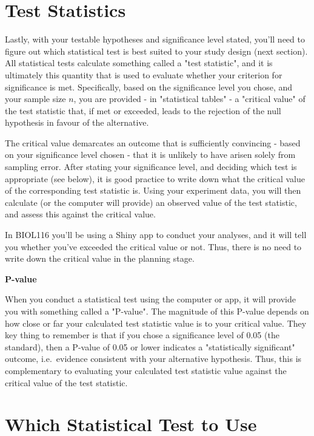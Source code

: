 \documentclass[
]{book}
\begin{document}
\hypertarget{test-statistics}{%
\section*{Test Statistics}\label{test-statistics}}

Lastly, with your testable hypotheses and significance level stated, you'll need to figure out which statistical test is best suited to your study design (next section). All statistical tests calculate something called a "test statistic", and it is ultimately this quantity that is used to evaluate whether your criterion for significance is met. Specifically, based on the significance level you chose, and your sample size \(n\), you are provided - in "statistical tables" - a "critical value" of the test statistic that, if met or exceeded, leads to the rejection of the null hypothesis in favour of the alternative.

The critical value demarcates an outcome that is sufficiently convincing - based on your significance level chosen - that it is unlikely to have arisen solely from sampling error. After stating your significance level, and deciding which test is appropriate (see below), it is good practice to write down what the critical value of the corresponding test statistic is. Using your experiment data, you will then calculate (or the computer will provide) an observed value of the test statistic, and assess this against the critical value.

In BIOL116 you'll be using a Shiny app to conduct your analyses, and it will tell you whether you've exceeded the critical value or not. Thus, there is no need to write down the critical value in the planning stage.

\textbf{P-value}

When you conduct a statistical test using the computer or app, it will provide you with something called a "P-value". The magnitude of this P-value depends on how close or far your calculated test statistic value is to your critical value. They key thing to remember is that if you chose a significance level of 0.05 (the standard), then a P-value of 0.05 or lower indicates a "statistically significant" outcome, i.e.~evidence consistent with your alternative hypothesis. Thus, this is complementary to evaluating your calculated test statistic value against the critical value of the test statistic.

\hypertarget{which-statistical-test-to-use}{%
\section*{Which Statistical Test to Use}\label{which-statistical-test-to-use}}
\end{document}
